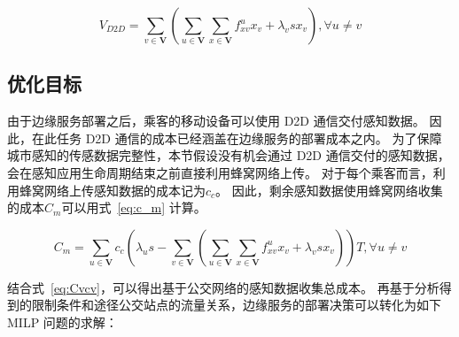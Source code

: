 \begin{equation}
\label{Vd2d}
V_{D2D} = \sum_{v\in \boldsymbol{V}}(\sum_{u\in \boldsymbol{V}}\sum_{x\in \boldsymbol{V}}f^u_{xv} x_v + \lambda_v s x_v), \forall u \neq v
\end{equation}

\subsection{优化目标}

由于边缘服务部署之后，乘客的移动设备可以使用 D2D 通信交付感知数据。
因此，在此任务 D2D 通信的成本已经涵盖在边缘服务的部署成本之内。
为了保障城市感知的传感数据完整性，本节假设没有机会通过 D2D 通信交付的感知数据，会在感知应用生命周期结束之前直接利用蜂窝网络上传。
对于每个乘客而言，利用蜂窝网络上传感知数据的成本记为$c_c$。
因此，剩余感知数据使用蜂窝网络收集的成本$C_m$可以用式~\eqref{eq:c_m} 计算。

\begin{equation}
\label{eq:c_m}
C_m = \sum_{u\in \boldsymbol{V}}c_c(\lambda_u s - \sum_{v\in \boldsymbol{V}}(\sum_{u\in \boldsymbol{V}}\sum_{x\in \boldsymbol{V}}f^u_{xv} x_v + \lambda_v s x_v))T, \forall u \neq v
\end{equation}

结合式~\eqref{eq:Cvcv}，可以得出基于公交网络的感知数据收集总成本。
再基于分析得到的限制条件和途径公交站点的流量关系，边缘服务的部署决策可以转化为如下 MILP 问题的求解：



